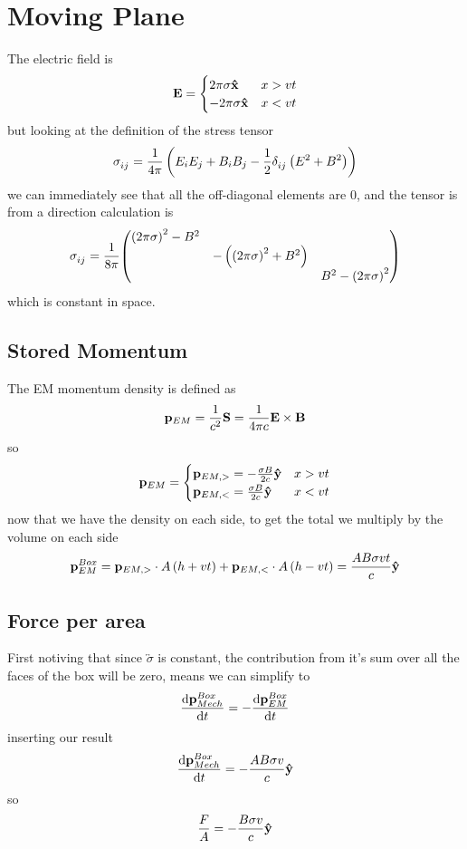 \clearpage
\section{Moving Plane}
The electric field is 
\begin{equation}
    \vb{E} = \begin{cases}
        2\pi\sigma\vu{x} & x>vt\\
        -2\pi\sigma\vu{x} & x<vt
    \end{cases}
\end{equation}
but looking at the definition of the stress tensor
\begin{equation}
    \tensor{\sigma}{_i_j} = \frac{1}{4\pi}\ins{E_i E_j + B_i B_j - \frac{1}{2}\tensor{\delta}{_i_j}\ins{E^2+B^2}}
\end{equation}
we can immediately see that all the off-diagonal elements are 0, and the tensor is from a direction calculation is 
\begin{equation}
    \tensor{\sigma}{_i_j} = \frac{1}{8\pi}\mqty(\ins{2\pi\sigma}^2-B^2&&\\&-\ins{\ins{2\pi\sigma}^2+B^2}&\\&&B^2-\ins{2\pi\sigma}^2)
\end{equation}
which is constant in space.
\subsection{Stored Momentum}
The EM momentum density is defined as 
\begin{equation}
    \vb{p}_{EM} = \frac{1}{c^2}\vb{S}= \frac{1}{4\pi c}\vb{E} \times \vb{B}
\end{equation}
so
\begin{equation}
    \vb{p}_{EM} = \begin{cases}
        \vb{p}_{EM,>} = -\frac{\sigma B}{2c}\vu{y} & x>vt\\
        \vb{p}_{EM,<} = \frac{\sigma B}{2c}\vu{y} & x<vt
    \end{cases}
\end{equation}
now that we have the density on each side, to get the total we multiply by the volume on each side
\begin{equation}
    \vb{p}_{EM}^{Box} = \vb{p}_{EM,>} \cdot A\left(h+vt\right) + \vb{p}_{EM,<} \cdot A\left(h-vt\right)=\frac{AB\sigma vt}{c}\vu{y}
\end{equation}
\subsection{Force per area}
First notiving that since \(\overleftrightarrow\sigma\) is constant, the contribution from it's sum over all the faces of the box will be zero, means we can simplify to 
\begin{equation}
    \dv{\vb{p}_{Mech}^{Box}}{t} = -\dv{\vb{p}_{EM}^{Box}}{t}
\end{equation}
inserting our result
\begin{equation}
    \dv{\vb{p}_{Mech}^{Box}}{t} = -\frac{AB\sigma v}{c}\vu{y}
\end{equation}
so
\begin{equation}
    \frac{F}{A} = -\frac{B\sigma v}{c}\vu{y}
\end{equation}
